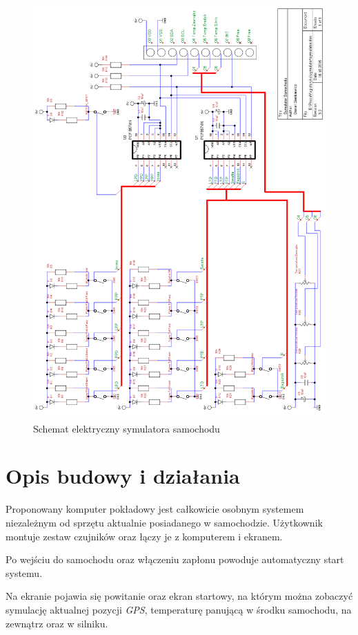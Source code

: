 \documentclass{xmgr}
\begin{document}
\begin{figure}[!hp]
    \centering
    	\includegraphics[height=0.9\textheight]{images/symulator.png}
    \caption{Schemat elektryczny symulatora samochodu}
\end{figure}

\section{Opis budowy i działania}
Proponowany komputer pokładowy jest całkowicie osobnym systemem niezależnym od sprzętu aktualnie posiadanego w samochodzie. Użytkownik montuje zestaw czujników oraz łączy je z komputerem i ekranem. 

Po wejściu do samochodu oraz włączeniu zapłonu powoduje automatyczny start systemu. 

Na ekranie pojawia się powitanie oraz ekran startowy, na którym można zobaczyć symulację aktualnej pozycji \emph{GPS}, temperaturę panującą w środku samochodu, na zewnątrz oraz w silniku. 
\end{document}
